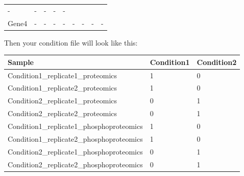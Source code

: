 \documentclass[]{article}
\begin{document}
\begin{longtable}[]{@{}lllllllll@{}}
\begin{minipage}[t]{0.08\columnwidth}
-\strut
\end{minipage} & \begin{minipage}[t]{0.08\columnwidth}\raggedright
-\strut
\end{minipage} & \begin{minipage}[t]{0.08\columnwidth}\raggedright
-\strut
\end{minipage} & \begin{minipage}[t]{0.08\columnwidth}\raggedright
-\strut
\end{minipage} & \begin{minipage}[t]{0.08\columnwidth}\raggedright
-\strut
\end{minipage}\tabularnewline
\begin{minipage}[t]{0.08\columnwidth}\raggedright
Gene4\strut
\end{minipage} & \begin{minipage}[t]{0.08\columnwidth}\raggedright
-\strut
\end{minipage} & \begin{minipage}[t]{0.08\columnwidth}\raggedright
-\strut
\end{minipage} & \begin{minipage}[t]{0.08\columnwidth}\raggedright
-\strut
\end{minipage} & \begin{minipage}[t]{0.08\columnwidth}\raggedright
-\strut
\end{minipage} & \begin{minipage}[t]{0.08\columnwidth}\raggedright
-\strut
\end{minipage} & \begin{minipage}[t]{0.08\columnwidth}\raggedright
-\strut
\end{minipage} & \begin{minipage}[t]{0.08\columnwidth}\raggedright
-\strut
\end{minipage} & \begin{minipage}[t]{0.08\columnwidth}\raggedright
-\strut
\end{minipage}\tabularnewline
\bottomrule
\end{longtable}

Then your condition file will look like this:

\begin{longtable}[]{@{}lll@{}}
\toprule
Sample & Condition1 & Condition2\tabularnewline
\midrule
\endhead
Condition1\_replicate1\_proteomics & 1 & 0\tabularnewline
Condition1\_replicate2\_proteomics & 1 & 0\tabularnewline
Condition2\_replicate1\_proteomics & 0 & 1\tabularnewline
Condition2\_replicate2\_proteomics & 0 & 1\tabularnewline
Condition1\_replicate1\_phosphoproteomics & 1 & 0\tabularnewline
Condition1\_replicate2\_phosphoproteomics & 1 & 0\tabularnewline
Condition2\_replicate1\_phosphoproteomics & 0 & 1\tabularnewline
Condition2\_replicate2\_phosphoproteomics & 0 & 1\tabularnewline
\bottomrule
\end{longtable}
\end{document}
